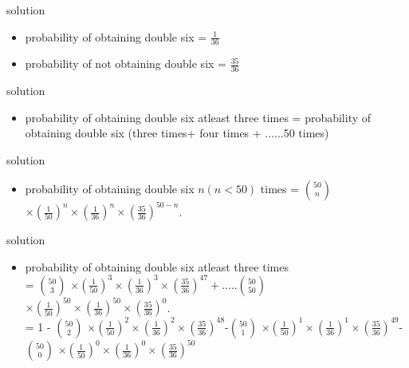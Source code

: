 \documentclass{beamer}
\begin{document}
\begin{frame}{solution}
    \begin{itemize}
    \item probability of obtaining double six = $\frac{1}{36}$
    \item probability of not obtaining double six = $\frac{35}{36}$
    \end{itemize}
    \end{frame}
    
    \begin{frame}{solution}
    \begin{itemize}
        
    \item probability of obtaining double six atleast three times = probability of obtaining double six (three times+ four times + ......50 times)\\
    
    \end{itemize}
    \end{frame}
    
    \begin{frame}{solution}
    \begin{itemize}
        \item 
        probability of obtaining double six $n(n<50)$ times = ${50}\choose{n}$ $\times (\frac{1}{50})^n \times (\frac{1}{36})^n \times (\frac{35}{36})^{50-n}$.\\
        
    \end{itemize}
    \end{frame}
    
    \begin{frame}{solution}
    \begin{itemize}
        \item 
            probability of obtaining double six atleast three times\\ = ${50}\choose{3}$ $\times(\frac{1}{50})^3\times(\frac{1}{36})^3\times(\frac{35}{36})^{47}+$.....${50}\choose{50}$ $\times(\frac{1}{50})^{50}\times(\frac{1}{36})^{50}\times(\frac{35}{36})^0$.\\
                    = 1 - ${50}\choose{2}$ $\times(\frac{1}{50})^2\times(\frac{1}{36})^2\times(\frac{35}{36})^{48}$-${50}\choose{1}$ $\times(\frac{1}{50})^1\times(\frac{1}{36})^1\times(\frac{35}{36})^{49}$-${50}\choose{0}$ $\times(\frac{1}{50})^0\times(\frac{1}{36})^0\times(\frac{35}{36})^{50}$\\
       
    \end{itemize}
    \end{frame}
    
\end{document}
